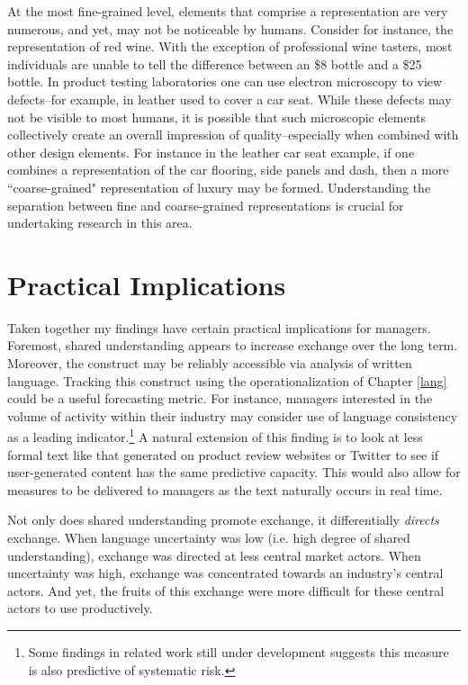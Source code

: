 At the most fine-grained level, elements that comprise a representation are very numerous, and yet, may not be noticeable by humans. Consider for instance, the representation of red wine. With the exception of professional wine tasters, most individuals are unable to tell the difference between an \$8 bottle and a \$25 bottle. In product testing laboratories one can use electron microscopy to view defects--for example, in leather used to cover a car seat. While these defects may not be visible to most humans, it is possible that such microscopic elements collectively create an overall impression of quality--especially when combined with other design elements. For instance in the leather car seat example, if one combines a representation of the car flooring, side panels and dash, then a more ``coarse-grained" representation of luxury may be formed. Understanding the separation between fine and coarse-grained representations is crucial for undertaking research in this area.

\section{Practical Implications}
Taken together my findings have certain practical implications for managers. Foremost, shared understanding appears to increase exchange over the long term. Moreover, the construct may be reliably accessible via analysis of written language. Tracking this construct using the operationalization of Chapter \ref{lang} could be a useful forecasting metric. For instance, managers interested in the volume of activity within their industry may consider use of language consistency as a leading indicator.\footnote{Some findings in related work still under development suggests this measure is also predictive of systematic risk.} A natural extension of this finding is to look at less formal text like that generated on product review websites or Twitter to see if user-generated content has the same predictive capacity. This would also allow for measures to be delivered to managers as the text naturally occurs in real time.

Not only does shared understanding promote exchange, it differentially \emph{directs} exchange. When language uncertainty was low (i.e. high degree of shared understanding), exchange was directed at less central market actors. When uncertainty was high, exchange was concentrated towards an industry's central actors. And yet, the fruits of this exchange were more difficult for these central actors to use productively. 

